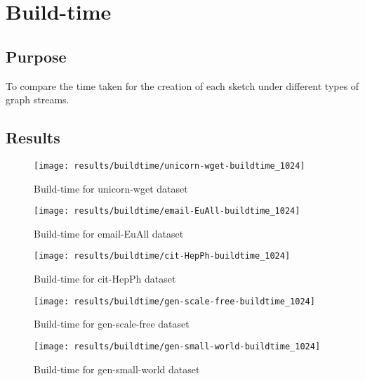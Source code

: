 \section{Build-time}

\subsection*{Purpose}
To compare the time taken for the creation of each sketch under different types of graph streams.

\subsection*{Results}

\begin{figure}[H]
    \centering \texttt{[image: results/buildtime/unicorn-wget-buildtime\_1024]}
    \vspace{-0.5cm}
    \caption{Build-time for unicorn-wget dataset}
    \label{fig:unicorn-wget-buildtime_1024}
\end{figure}

\begin{figure}[H]
    \centering \texttt{[image: results/buildtime/email-EuAll-buildtime\_1024]}
    \vspace{-0.5cm}
    \caption{Build-time for email-EuAll dataset}
    \label{fig:email-EuAll-buildtime_1024}
\end{figure}

\begin{figure}[H]
    \centering \texttt{[image: results/buildtime/cit-HepPh-buildtime\_1024]}
    \vspace{-0.5cm}
    \caption{Build-time for cit-HepPh dataset}
    \label{fig:cit-HepPh-buildtime_1024}
\end{figure}

\begin{figure}[H]
    \centering \texttt{[image: results/buildtime/gen-scale-free-buildtime\_1024]}
    \vspace{-0.5cm}
    \caption{Build-time for gen-scale-free dataset}
    \label{fig:gen-scale-free-buildtime_1024}
\end{figure}

\begin{figure}[H]
    \centering \texttt{[image: results/buildtime/gen-small-world-buildtime\_1024]}
    \vspace{-0.5cm}
    \caption{Build-time for gen-small-world dataset}
    \label{fig:gen-small-world-buildtime_1024}
\end{figure}


